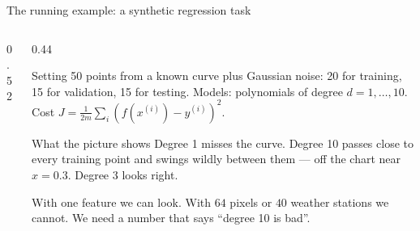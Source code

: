 \documentclass[aspectratio=169,10pt]{beamer}
\begin{document}
\begin{frame}{The running example: a synthetic regression task}
\begin{columns}[T,onlytextwidth]
\begin{column}{0.52\textwidth}
    \end{column}
    \begin{column}{0.44\textwidth}
      \footnotesize
      \begin{block}{Setting}
        50 points from a known curve plus Gaussian noise: 20 for training, 15 for validation,
        15 for testing. Models: polynomials of degree $d=1,\dots,10$. Cost
        $J=\frac{1}{2m}\sum_i(f(x^{(i)})-y^{(i)})^2$.
      \end{block}
      \begin{block}{What the picture shows}
        Degree 1 misses the curve. Degree 10 passes close to every training point and swings
        wildly between them --- off the chart near $x=0.3$. Degree 3 looks right.
      \end{block}
      \begin{pitfall}
        \footnotesize With one feature we can look. With $64$ pixels or $40$ weather
        stations we cannot. We need a number that says ``degree 10 is bad''.
      \end{pitfall}
    \end{column}
  \end{columns}
\end{frame}
\end{document}
